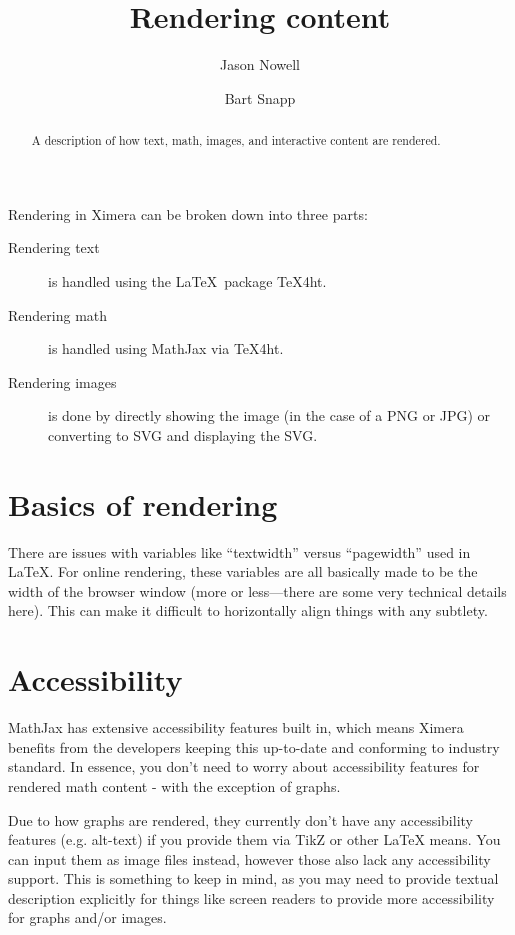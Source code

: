 \documentclass{ximera}
\title{Rendering content}
\author{Jason Nowell \and Bart Snapp}
\begin{document}
\begin{abstract}
    A description of how text, math, images, and interactive content are
    rendered.
\end{abstract}
\maketitle

Rendering in Ximera can be broken down into three parts:
\begin{description}
    \item[Rendering text] is handled using the \LaTeX\ package TeX4ht.
    \item[Rendering math] is handled using MathJax via TeX4ht.
    \item[Rendering images] is done by directly showing the image (in the case
        of a PNG or JPG) or converting to SVG and displaying the SVG.
\end{description}

\section{Basics of rendering}

There are issues with variables like ``textwidth'' versus
``pagewidth'' used in \LaTeX. For online rendering, these variables are all
basically made to be the width of the browser window (more or less---there are
some very technical details here). This can make it difficult to horizontally
align things with any subtlety.






\section{Accessibility}
MathJax has extensive accessibility features built in, which means
Ximera benefits from the developers keeping this up-to-date and conforming to
industry standard. In essence, you don't need to worry about accessibility
features for rendered math content - with the exception of graphs.

Due to how graphs are rendered, they currently don't have any
accessibility features (e.g. alt-text) if you provide them via TikZ or other
LaTeX means. You can input them as image files instead, however those also lack
any accessibility support. This is something to keep in mind, as you may need
to provide textual description explicitly for things like screen readers to
provide more accessibility for graphs and/or images.
\end{document}
